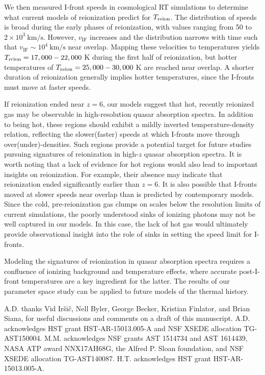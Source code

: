 \documentclass[twocolumn]{aastex62}
\newcommand{\Treion}{T_{\rm reion}}
\newcommand{\vIF}{v_{\mathrm{IF}}}
\begin{document}
We then measured I-front speeds in cosmological RT simulations to determine what current models of reionization predict for $\Treion$.  The distribution of speeds is broad during the early phases of reionization, with values ranging from 50 to $2 \times 10^3~\mathrm{km/s}$.  However, $\vIF$ increases and the distribution narrows with time such that $\vIF \sim 10^4~\mathrm{km/s}$ near overlap.  Mapping these velocities to temperatures yields $\Treion = 17,000-22,000$ K during the first half of reionization, but hotter temperatures of $\Treion = 25,000 - 30,000$ K are reached near overlap.  A shorter duration of reionization generally implies hotter temperatures, since the I-fronts must move at faster speeds.  

If reionization ended near $z=6$, our models suggest that hot, recently reionized gas may be observable in high-resolution quasar absorption spectra.  In addition to being hot, these regions should exhibit a mildly inverted temperature-density relation, reflecting the slower(faster) speeds at which I-fronts move through over(under)-densities.  Such regions provide a potential target for future studies pursuing signatures of reionization in high-$z$ quasar absorption spectra.   It is worth noting that a lack of evidence for hot regions would also lead to important insights on reionization.  For example, their absence may indicate that reionization ended significantly earlier than $z=6$.  It is also possible that I-fronts moved at slower speeds near overlap than is predicted by contemporary models.  Since the cold, pre-reionization gas clumps on scales below the resolution limits of current simulations, the poorly understood sinks of ionizing photons may not be well captured in our models.  In this case, the lack of hot gas would ultimately provide observational insight into the role of sinks in setting the speed limit for I-fronts.      

Modeling the signatures of reionization in quasar absorption spectra requires a confluence of ionizing background and temperature effects, where accurate post-I-front temperatures are a key ingredient for the latter. The results of our parameter space study can be applied to future models of the thermal history. 

\acknowledgments

A.D. thanks Vid Ir\v{s}i\v{c}, Nell Byler, George Becker, Kristian Finlator, and Brian Siana, for useful discussions and comments on a draft of this manuscript.  A.D. acknowledges HST grant HST-AR-15013.005-A and NSF XSEDE allocation TG-AST150004.  M.M. acknowledges NSF grants AST 1514734 and AST 1614439, NASA ATP award NNX17AH68G, the Alfred P. Sloan foundation, and NSF XSEDE allocation TG-AST140087. H.T. acknowledges HST grant HST-AR-15013.005-A. 
\end{document}
